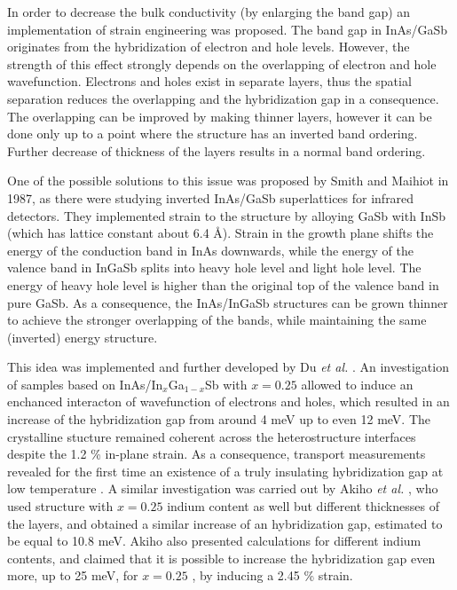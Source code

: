 \documentclass[titlepage,a4paper]{book}
\begin{document}
In order to decrease the bulk conductivity (by enlarging the band gap) an implementation of strain engineering was proposed. The band gap in InAs/GaSb originates from the hybridization of electron and hole levels. However, the strength of this effect strongly depends on the overlapping of electron and hole wavefunction. Electrons and holes exist in separate layers, thus the spatial separation reduces the overlapping and the hybridization gap in a consequence. The overlapping can be improved by making thinner layers, however it can be done only up to a point where the structure has an inverted band ordering. Further decrease of thickness of the layers results in a normal band ordering.

One of the possible solutions to this issue was proposed \cite{Smith_State} by Smith and Maihiot in 1987, as there were studying inverted InAs/GaSb superlattices for infrared detectors. They implemented strain to the structure by alloying GaSb with InSb (which has lattice constant about 6.4 Å). Strain in the growth plane shifts the energy of the conduction band in InAs downwards, while the energy of the valence band in InGaSb splits into heavy hole level and light hole level. The energy of heavy hole level is higher than the original top of the valence band in pure GaSb. As a consequence, the InAs/InGaSb structures can be grown thinner to achieve the stronger overlapping of the bands, while maintaining the same (inverted) energy structure.

This idea was implemented and further developed by Du \textit{et al.} \cite{Du_State2}. An investigation of samples based on InAs/In$_x$Ga$_{1-x}$Sb with $x = 0.25$ allowed to induce an enchanced interacton of wavefunction of electrons and holes, which resulted in an increase of the hybridization gap from around 4 meV up to even 12 meV. The crystalline stucture remained coherent across the heterostructure interfaces despite the 1.2 \% in-plane strain. As a consequence, transport measurements revealed for the first time an existence of a truly insulating hybridization gap at low temperature \cite{Du_State2}. A similar investigation was carried out by Akiho \textit{et al.} \cite{Akiho_State}, who used structure with $x = 0.25$ indium content as well but different thicknesses of the layers, and obtained a similar increase of an hybridization gap, estimated to be equal to 10.8 meV. Akiho also presented calculations for different indium contents, and claimed that it is possible to increase the hybridization gap even more, up to 25 meV, for $x = 0.25$ \cite{Akiho_State}, by inducing a 2.45 \% strain.
\end{document}
